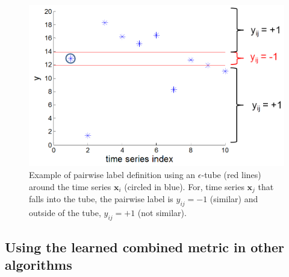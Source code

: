 \begin{figure}[h!]
	\centering
	\includegraphics[width=0.65\linewidth]{images/pairwise_label_tube}
	\caption{Example of pairwise label definition using an $\epsilon$-tube (red lines) around the time series $\textbf{x}_i$ (circled in blue). For, time series $\textbf{x}_j$ that falls into the tube, the pairwise label is $y_{ij} = -1$ (similar) and outside of the tube, $y_{ij} = +1$ (not similar).}
	\label{fig:pairwise_label_tube}
\end{figure}


\subsection*{Using the learned combined metric in other algorithms}




